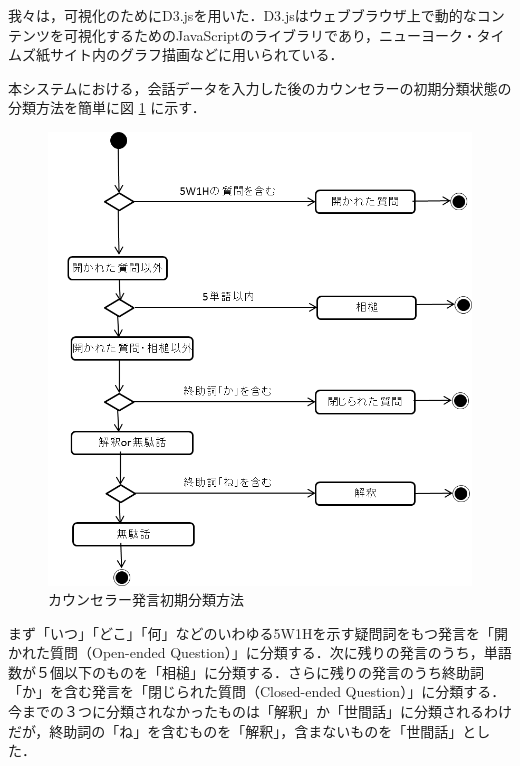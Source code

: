 \documentclass[shuuron]{kuee}
\begin{document}

我々は，可視化のためにD3.js\cite{vand3}を用いた．D3.jsはウェブブラウザ上で動的なコンテンツを可視化するためのJavaScriptのライブラリであり，ニューヨーク・タイムズ紙サイト内のグラフ描画などに用いられている．



本システムにおける，会話データを入力した後のカウンセラーの初期分類状態の分類方法を簡単に図
\ref{fig:5_2}
に示す．
\begin{figure}
  \begin{center}
    \includegraphics[width=\linewidth]{5_2.png}
  \end{center}
  \caption{カウンセラー発言初期分類方法}
  \label{fig:5_2}
\end{figure}
まず「いつ」「どこ」「何」などのいわゆる5W1Hを示す疑問詞をもつ発言を「開かれた質問（Open-ended Question）」に分類する．次に残りの発言のうち，単語数が５個以下のものを「相槌」に分類する．さらに残りの発言のうち終助詞「か」を含む発言を「閉じられた質問（Closed-ended Question）」に分類する．今までの３つに分類されなかったものは「解釈」か「世間話」に分類されるわけだが，終助詞の「ね」を含むものを「解釈」，含まないものを「世間話」とした．
\end{document}
